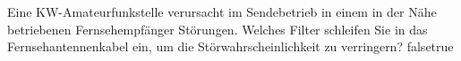     {Eine KW-Amateurfunkstelle verursacht im Sendebetrieb in einem in der Nähe betriebenen Fernsehempfänger Störungen. Welches Filter schleifen Sie in das Fernsehantennenkabel ein, um die Störwahrscheinlichkeit zu verringern?}
    {}
    {}
    {}
    {}
    {false}{true}